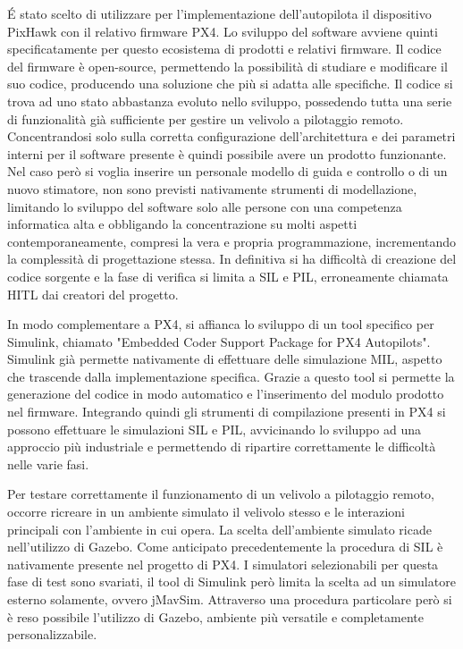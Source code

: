 \'E stato scelto di utilizzare per l'implementazione dell'autopilota il dispositivo PixHawk con il relativo firmware PX4. Lo sviluppo del software avviene quinti specificatamente per questo ecosistema di prodotti e relativi firmware. Il codice del firmware è open-source, permettendo la possibilità di studiare e modificare il suo codice, producendo una soluzione che più si adatta alle specifiche. Il codice si trova ad uno stato abbastanza evoluto nello sviluppo, possedendo tutta una serie di funzionalità già sufficiente per gestire un velivolo a pilotaggio remoto. Concentrandosi solo sulla corretta configurazione dell'architettura e dei parametri interni per il software presente è quindi possibile avere un prodotto funzionante. Nel caso però si voglia inserire un personale modello di guida e controllo o di un nuovo stimatore, non sono previsti nativamente strumenti di modellazione, limitando lo sviluppo del software solo alle persone con una competenza informatica alta e obbligando la concentrazione su molti aspetti contemporaneamente, compresi la  vera e propria programmazione, incrementando la complessità di progettazione stessa. In definitiva si ha difficoltà di creazione del codice sorgente e la fase di verifica si limita a SIL e PIL, erroneamente chiamata HITL dai creatori del progetto.

In modo complementare a PX4, si affianca lo sviluppo di un tool specifico per Simulink, chiamato "Embedded Coder Support Package
for PX4 Autopilots". Simulink già permette nativamente di effettuare delle simulazione MIL, aspetto che trascende dalla implementazione specifica. Grazie a questo tool si permette la generazione del codice in modo automatico e l'inserimento del modulo prodotto nel firmware. Integrando quindi gli strumenti di compilazione presenti in PX4 si possono effettuare le simulazioni SIL e PIL, avvicinando lo sviluppo ad una approccio più industriale e permettendo di ripartire correttamente le difficoltà nelle varie fasi.

Per testare correttamente il funzionamento di un velivolo a pilotaggio remoto, occorre ricreare in un ambiente simulato il velivolo stesso e le interazioni principali con l'ambiente in cui opera. La scelta dell'ambiente simulato ricade nell'utilizzo di Gazebo. Come anticipato precedentemente la procedura di SIL è nativamente presente nel progetto di PX4. I simulatori selezionabili per questa fase di test sono svariati, il tool di Simulink però limita la scelta ad un simulatore esterno solamente, ovvero jMavSim. Attraverso una procedura particolare però si è reso possibile l'utilizzo di Gazebo, ambiente più versatile e completamente personalizzabile.

